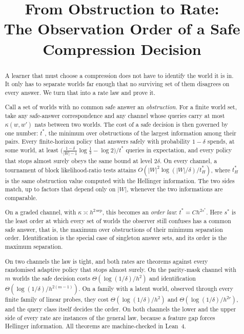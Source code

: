 



\title{From Obstruction to Rate:\\The Observation Order of a Safe Compression Decision}

\author{
}

\maketitle

\begin{abstract}
A learner that must choose a compression does not have to identify the world it is in. It
only has to separate worlds far enough that no surviving set of them disagrees on every
answer. We turn that into a rate law and prove it.

Call a set of worlds with no common safe answer an \emph{obstruction}. For a finite world
set, take any safe-answer correspondence and any channel whose queries carry at most
$\kappa(w,w')$ nats between two worlds. The cost of a safe decision is then governed by one
number: $t^{*}$, the minimum over obstructions of the largest information among their pairs.
Every finite-horizon policy that answers safely with probability $1-\delta$ spends, at some
world, at least $\bigl(\frac{1-\delta}{|W|-1}\log\frac1\delta-\log2\bigr)/t^{*}$ queries in
expectation, and every policy that stops almost surely obeys the same bound at level
$2\delta$. On every channel, a tournament of block likelihood-ratio tests attains
$O(|W|^{2}\log(|W|/\delta)/t^{*}_{H})$, where $t^{*}_{H}$ is the same obstruction value computed
with the Hellinger information. The two sides match, up to factors that depend only on $|W|$,
whenever the two informations are comparable.

On a graded channel, with $\kappa\asymp h^{2\,\mathrm{sep}}$, this becomes an \emph{order law}:
$t^{*}=Ch^{2s^{*}}$. Here $s^{*}$ is the least order at which every set of worlds the observer
still confuses has a common safe answer, that is, the maximum over obstructions of their
minimum separation order. Identification is the special case of singleton answer sets, and its
order is the maximum separation.

On two channels the law is tight, and both rates are theorems against every randomised adaptive
policy that stops almost surely. On the parity-mask channel with $m$ worlds the safe decision
costs $\Theta(\log(1/\delta)/h^{2})$ and identification $\Theta(\log(1/\delta)/h^{2(m-1)})$. On a
family with a latent world, observed through every finite family of linear probes, they cost
$\Theta(\log(1/\delta)/h^{2})$ and $\Theta(\log(1/\delta)/h^{2r})$, and the query class itself
decides the order. On both channels the lower and the upper side of every rate are instances of
the general law, because a feature gap forces Hellinger information. All theorems are
machine-checked in Lean~4.
\end{abstract}

